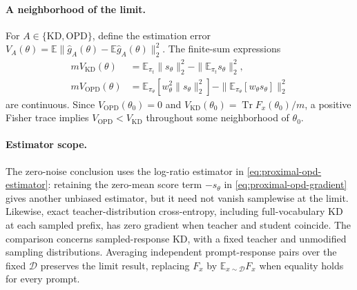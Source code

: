 \paragraph{A neighborhood of the limit.}
For $A\in\{\mathrm{KD},\mathrm{OPD}\}$, define the estimation error
$V_A(\theta)=\mathbb E\|\widehat g_A(\theta)
-\mathbb E\widehat g_A(\theta)\|_2^2$.
The finite-sum expressions
\begin{align}
 mV_{\mathrm{KD}}(\theta)
 &=\mathbb E_{\pi_t}\|s_\theta\|_2^2
       -\|\mathbb E_{\pi_t}s_\theta\|_2^2,\nonumber\\
 mV_{\mathrm{OPD}}(\theta)
 &=\mathbb E_{\pi_\theta}[w_\theta^2\|s_\theta\|_2^2]
       -\|\mathbb E_{\pi_\theta}[w_\theta s_\theta]\|_2^2
 \label{eq:proximal-estimation-error}
\end{align}
are continuous. Since $V_{\mathrm{OPD}}(\theta_0)=0$ and
$V_{\mathrm{KD}}(\theta_0)=\operatorname{Tr}F_x(\theta_0)/m$,
a positive Fisher trace implies $V_{\mathrm{OPD}}<V_{\mathrm{KD}}$
throughout some neighborhood of $\theta_0$.

\paragraph{Estimator scope.}
The zero-noise conclusion uses the log-ratio estimator in
\eqref{eq:proximal-opd-estimator}: retaining the zero-mean score term
$-s_\theta$ in \eqref{eq:proximal-opd-gradient} gives another unbiased
estimator, but it need not vanish samplewise at the limit. Likewise,
exact teacher-distribution cross-entropy, including full-vocabulary KD at
each sampled prefix, has zero gradient when teacher and student coincide.
The comparison concerns sampled-response KD, with a fixed teacher and
unmodified sampling distributions. Averaging independent prompt-response
pairs over the fixed $\mathcal D$ preserves the limit result, replacing
$F_x$ by $\mathbb E_{x\sim\mathcal D}F_x$ when equality holds for every prompt.
